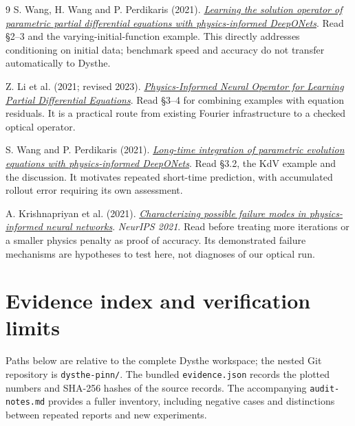 \documentclass[11pt]{article}
\begin{document}
\begin{thebibliography}{9}
 S. Wang, H. Wang and P. Perdikaris (2021).
\href{https://arxiv.org/abs/2103.10974}{\emph{Learning the solution operator of parametric partial differential equations with physics-informed DeepONets}}.
Read \S2--3 and the varying-initial-function example. This directly addresses conditioning on initial data; benchmark speed and accuracy do not transfer automatically to Dysthe.

 Z. Li et al. (2021; revised 2023).
\href{https://arxiv.org/abs/2111.03794}{\emph{Physics-Informed Neural Operator for Learning Partial Differential Equations}}.
Read \S3--4 for combining examples with equation residuals. It is a practical route from existing Fourier infrastructure to a checked optical operator.

 S. Wang and P. Perdikaris (2021).
\href{https://arxiv.org/abs/2106.05384}{\emph{Long-time integration of parametric evolution equations with physics-informed DeepONets}}.
Read \S3.2, the KdV example and the discussion. It motivates repeated short-time prediction, with accumulated rollout error requiring its own assessment.

 A. Krishnapriyan et al. (2021).
\href{https://arxiv.org/abs/2109.01050}{\emph{Characterizing possible failure modes in physics-informed neural networks}}.
\emph{NeurIPS 2021}.
Read before treating more iterations or a smaller physics penalty as proof of accuracy. Its demonstrated failure mechanisms are hypotheses to test here, not diagnoses of our optical run.
\end{thebibliography}

\newpage
\section{Evidence index and verification limits}
Paths below are relative to the complete Dysthe workspace; the nested Git repository is \texttt{dysthe-pinn/}. The bundled \texttt{evidence.json} records the plotted numbers and SHA-256 hashes of the source records. The accompanying \texttt{audit-notes.md} provides a fuller inventory, including negative cases and distinctions between repeated reports and new experiments.
\end{document}
